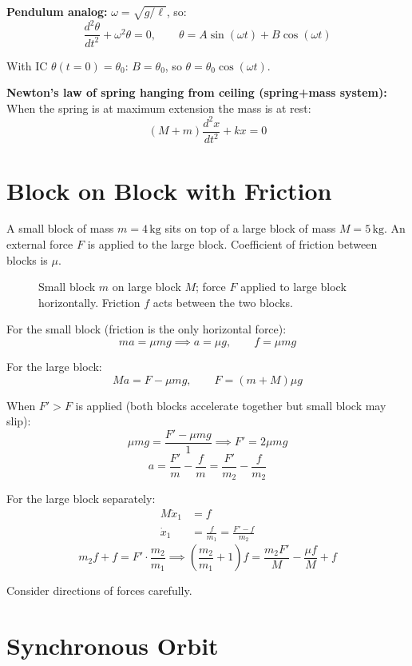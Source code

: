 \textbf{Pendulum analog:} $\omega = \sqrt{g/\ell}$, so:
\[
\frac{d^2\theta}{dt^2} + \omega^2\theta = 0, \qquad \theta = A\sin(\omega t) + B\cos(\omega t)
\]

With IC $\theta(t=0) = \theta_0$: $B = \theta_0$, so $\theta = \theta_0\cos(\omega t)$.

\textbf{Newton's law of spring hanging from ceiling (spring+mass system):} When the spring is at maximum extension the mass is at rest:
\[
(M + m)\frac{d^2x}{dt^2} + kx = 0
\]

\section{Block on Block with Friction}

\begin{example}
A small block of mass $m = 4\,\mathrm{kg}$ sits on top of a large block of mass $M = 5\,\mathrm{kg}$. An external force $F$ is applied to the large block. Coefficient of friction between blocks is $\mu$.

\begin{figure}[H]\centering
\caption{Small block $m$ on large block $M$; force $F$ applied to large block horizontally. Friction $f$ acts between the two blocks.}
\end{figure}

For the small block (friction is the only horizontal force):
\[
ma = \mu mg \implies a = \mu g, \qquad f = \mu mg
\]

For the large block:
\[
Ma = F - \mu mg, \qquad F = (m + M)\mu g
\]

When $F' > F$ is applied (both blocks accelerate together but small block may slip):
\[
\mu mg = \frac{F' - \mu mg}{1} \implies F' = 2\mu mg
\]
\[
a = \frac{F'}{m} - \frac{f}{m} = \frac{F'}{m_2} - \frac{f}{m_2}
\]

For the large block separately:
\begin{align*}
M\ddot{x}_1 &= f \\
\dot{x}_1 &= \frac{f}{m_1} = \frac{F' - f}{m_2}
\end{align*}
\[
m_2 f + f = F' \cdot \frac{m_2}{m_1} \implies \left(\frac{m_2}{m_1} + 1\right)f = \frac{m_2 F'}{M} - \frac{\mu f}{M} + f
\]

Consider directions of forces carefully.
\end{example}

\section{Synchronous Orbit}


